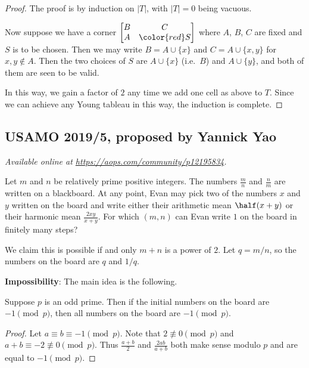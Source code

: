 \documentclass[11pt]{scrartcl}
\begin{document}
\begin{proof}
  The proof is by induction on $|T|$,
  with $|T| = 0$ being vacuous.

  Now suppose we have a corner $\begin{bmatrix}
  B & C \\ A & {\color{red}S} \end{bmatrix}$
  where $A$, $B$, $C$ are fixed and $S$ is to be chosen.
  Then we may write $B = A \cup \{x\}$ and $C = A \cup \{x,y\}$
  for $x,y \notin A$.
  Then the two choices of $S$ are $A \cup \{x\}$ (i.e.\ $B$)
  and $A \cup \{y\}$, and both of them are seen to be valid.

  In this way, we gain a factor of $2$
  any time we add one cell as above to $T$.
  Since we can achieve any Young tableau in this way,
  the induction is complete.
\end{proof}
\pagebreak

\subsection{USAMO 2019/5, proposed by Yannick Yao}
\textsl{Available online at \url{https://aops.com/community/p12195834}.}
\begin{mdframed}[style=mdpurplebox,frametitle={Problem statement}]
Let $m$ and $n$ be relatively prime positive integers.
The numbers $\frac mn$ and $\frac nm$ are written on a blackboard.
At any point, Evan may pick two of the numbers $x$ and $y$
written on the board and write either their arithmetic mean $\half(x+y)$
or their harmonic mean $\frac{2xy}{x+y}$.
For which $(m,n)$ can Evan write $1$ on the board in finitely many steps?
\end{mdframed}
We claim this is possible if and only $m+n$ is a power of $2$.
Let $q = m/n$, so the numbers on the board
are $q$ and $1/q$.

\textbf{Impossibility}:
The main idea is the following.
\begin{claim*}
  Suppose $p$ is an odd prime.
  Then if the initial numbers on the board are $-1 \pmod p$,
  then all numbers on the board are $-1 \pmod p$.
\end{claim*}
\begin{proof}
  Let $a \equiv b \equiv -1 \pmod p$.
  Note that $2 \not\equiv 0 \pmod p$
  and $a+b \equiv -2 \not\equiv 0 \pmod p$.
  Thus $\frac{a+b}{2}$ and $\frac{2ab}{a+b}$
  both make sense modulo $p$ and are equal to $-1 \pmod p$.
\end{proof}
\end{document}

